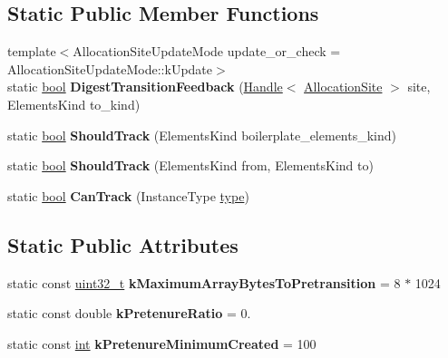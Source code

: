 \subsection*{Static Public Member Functions}
\begin{DoxyCompactItemize}
\item 
\mbox{\label{classv8_1_1internal_1_1AllocationSite_aa995dca4fbdcc35ed5818ad672508ee3}} 
{\footnotesize template$<$Allocation\+Site\+Update\+Mode update\+\_\+or\+\_\+check = Allocation\+Site\+Update\+Mode\+::k\+Update$>$ }\\static \mbox{\hyperlink{classbool}{bool}} {\bfseries Digest\+Transition\+Feedback} (\mbox{\hyperlink{classv8_1_1internal_1_1Handle}{Handle}}$<$ \mbox{\hyperlink{classv8_1_1internal_1_1AllocationSite}{Allocation\+Site}} $>$ site, Elements\+Kind to\+\_\+kind)
\item 
\mbox{\label{classv8_1_1internal_1_1AllocationSite_a596f5281700441022ddf66ba8a1b2d03}} 
static \mbox{\hyperlink{classbool}{bool}} {\bfseries Should\+Track} (Elements\+Kind boilerplate\+\_\+elements\+\_\+kind)
\item 
\mbox{\label{classv8_1_1internal_1_1AllocationSite_af38a6648a1495ca603f8ee8f68c826a7}} 
static \mbox{\hyperlink{classbool}{bool}} {\bfseries Should\+Track} (Elements\+Kind from, Elements\+Kind to)
\item 
\mbox{\label{classv8_1_1internal_1_1AllocationSite_a5bce0a6a275e0f9a9c8a3e87babab0d9}} 
static \mbox{\hyperlink{classbool}{bool}} {\bfseries Can\+Track} (Instance\+Type \mbox{\hyperlink{classstd_1_1conditional_1_1type}{type}})
\end{DoxyCompactItemize}
\subsection*{Static Public Attributes}
\begin{DoxyCompactItemize}
\item 
\mbox{\label{classv8_1_1internal_1_1AllocationSite_aeead57f97b16bf614a5631349d0bc7f1}} 
static const \mbox{\hyperlink{classuint32__t}{uint32\+\_\+t}} {\bfseries k\+Maximum\+Array\+Bytes\+To\+Pretransition} = 8 $\ast$ 1024
\item 
\mbox{\label{classv8_1_1internal_1_1AllocationSite_a45d58b4d64823e7d33eeb2291b26fb3a}} 
static const double {\bfseries k\+Pretenure\+Ratio} = 0.
\item 
\mbox{\label{classv8_1_1internal_1_1AllocationSite_a60cc20b9d1f816783e6c112029776861}} 
static const \mbox{\hyperlink{classint}{int}} {\bfseries k\+Pretenure\+Minimum\+Created} = 100
\end{DoxyCompactItemize}


